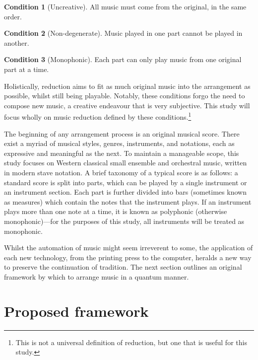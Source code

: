 \documentclass[twocolumn]{article}
\theoremstyle{definition}
\newtheorem{condition}{Condition}
\begin{document}
\begin{condition}[Uncreative]
    All music must come from the original, in the same order.
    \label{con:uncreative}
\end{condition}
\begin{condition}[Non-degenerate]
    Music played in one part cannot be played in another.
    \label{con:non-degenerate}
\end{condition}
\begin{condition}[Monophonic]
    Each part can only play music from one original part at a time.
    \label{con:monophonic}
\end{condition}

Holistically, reduction aims to fit as much original music into the arrangement as possible, whilst still being playable. Notably, these conditions forgo the need to compose new music, a creative endeavour that is very subjective. This study will focus wholly on music reduction defined by these conditions.\footnote{This is not a universal definition of reduction, but one that is useful for this study.}

The beginning of any arrangement process is an original musical score. There exist a myriad of musical styles, genres, instruments, and notations, each as expressive and meaningful as the next. To maintain a manageable scope, this study focuses on Western classical small ensemble and orchestral music, written in modern stave notation. A brief taxonomy of a typical score is as follows: a standard score is split into parts, which can be played by a single instrument or an instrument section. Each part is further divided into bars (sometimes known as measures) which contain the notes that the instrument plays. If an instrument plays more than one note at a time, it is known as polyphonic (otherwise monophonic)---for the purposes of this study, all instruments will be treated as monophonic.

Whilst the automation of music might seem irreverent to some, the application of each new technology, from the printing press to the computer, heralds a new way to preserve the continuation of tradition. The next section outlines an original framework by which to arrange music in a quantum manner.

\section{Proposed framework}
\end{document}

